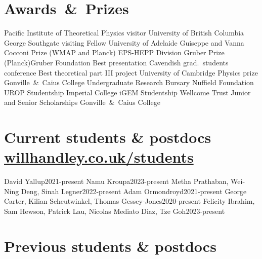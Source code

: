 \documentclass[11pt,a4paper,sans]{moderncv}
\begin{document}
\section{Awards~\&~Prizes}
  {Pacific Institute of Theoretical Physics visitor}         {University of British Columbia}
  {George Southgate visiting Fellow}         {University of Adelaide}
  {Guiseppe and Vanna Cocconi Prize (WMAP and Planck)}         {EPS-HEPP Division}
  {Gruber Prize (Planck)}{Gruber Foundation}
  {Best presentation}                 {Cavendish grad.\ students conference}
  {Best theoretical part III project} {University of Cambridge} 
\cvitemwithcomment{}            {Physics prize}                     {Gonville~\&~Caius College} 
 {Undergraduate Research Bursary}    {Nuffield Foundation}  
\cvitemwithcomment{}            {UROP Studentship}                  {Imperial College} 
 {iGEM Studentship}                  {Wellcome Trust} 
    {Junior and Senior Scholarships}    {Gonville~\&~Caius College} 

\section{Current students \& postdocs \hfill\href{https://www.willhandley.co.uk/students}{willhandley.co.uk/students}}
  {David Yallup}{2021-present}
 {Namu Kroupa}{2023-present}
\cvitemwithcomment{} {Metha Prathaban, Wei-Ning Deng, Sinah Legner}{2022-present}
\cvitemwithcomment{}  {Adam Ormondroyd}{2021-present}
\cvitemwithcomment{}  {George Carter, Kilian Scheutwinkel, Thomas Gessey-Jones}{2020-present}
  {Felicity Ibrahim, Sam Hewson, Patrick Lau, Nicolas Mediato Diaz, Tze Goh}{2023-present}

\pagebreak
\section{Previous students \& postdocs}
\end{document}

